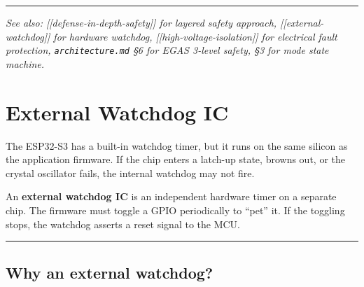 \documentclass[12pt,a4paper,oneside]{report}
\begin{document}
\begin{center}\rule{0.5\linewidth}{0.5pt}\end{center}

\emph{See also: {[}{[}defense-in-depth-safety{]}{]} for layered safety approach,
{[}{[}external-watchdog{]}{]} for hardware watchdog,
{[}{[}high-voltage-isolation{]}{]} for electrical fault protection,
\texttt{architecture.md} §6 for EGAS 3-level safety, §3 for mode state machine.}


\chapter{External Watchdog IC}\label{external-watchdog-ic}

The ESP32-S3 has a built-in watchdog timer, but it runs on the same silicon as
the application firmware. If the chip enters a latch-up state, browns out, or
the crystal oscillator fails, the internal watchdog may not fire.

An \textbf{external watchdog IC} is an independent hardware timer on a separate
chip. The firmware must toggle a GPIO periodically to ``pet'' it. If the
toggling stops, the watchdog asserts a reset signal to the MCU.

\begin{center}\rule{0.5\linewidth}{0.5pt}\end{center}

\section{Why an external watchdog?}\label{why-an-external-watchdog}
\end{document}
